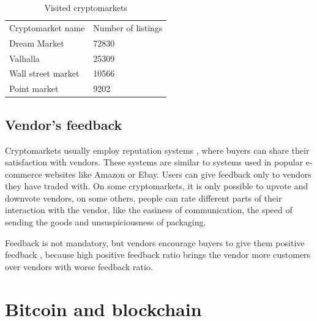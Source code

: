 \documentclass[
  digital, %
  table,   %
  lof,     %
  lot,     %
  oneside
]{fithesis3}
\begin{document}
\begin{table}
    \caption{Visited cryptomarkets}
    \label{cryptomarkets}
    \begin{tabular}{|l|l|}
    Cryptomarket name & Number of listings\\
    Dream Market & 72830 \\
    Valhalla     & 25309 \\
    Wall street market   & 10566 \\
    Point market  & 9202 \\
    \end{tabular}
\end{table}

\subsection{Vendor's feedback}

Cryptomarkets usually employ reputation systems \cite{resnick2000reputation},
where buyers can share their satisfaction with vendors.
These systems are similar to systems used in popular e-commerce websites like Amazon or Ebay.
Users can give feedback only to vendors they have traded with.
On some cryptomarkets, it is only possible to upvote and downvote vendors,
on some others, people can rate different parts of their interaction with the vendor,
like the easiness of communication,
the speed of sending the goods and unsuspiciousness of packaging.

Feedback is not mandatory, but vendors encourage buyers to give them positive feedback
\cite{aldridge2014not}\cite{soska2015measuring}, because high positive feedback
ratio brings the vendor more customers over vendors with worse feedback ratio.

\section{Bitcoin and blockchain}
\end{document}
